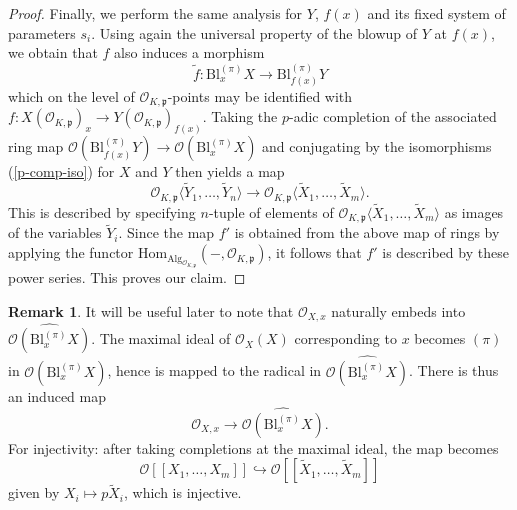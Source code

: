 \documentclass[11pt,oneside]{amsart}
\theoremstyle{plain}
\theoremstyle{definition}
\newtheorem{remark}[theorem]{Remark}
\def\oh{\mathcal{O}}
\begin{document}
\begin{proof}
Finally, we perform the same analysis for $Y$, $f(x)$ and its fixed system of parameters $s_i$. Using again the universal property of the blowup of $Y$ at $f(x)$, we obtain that $f$ also induces a morphism 
$$\tilde{f}: \mathrm{Bl}_x^{(\pi)} X \rightarrow \mathrm{Bl}_{f(x)}^{(\pi)} Y$$ %
which on the level of $\oh_{K,\mathfrak{p}}$-points may be identified with $f: X(\oh_{K, \mathfrak{p}})_x\rightarrow Y(\oh_{K, \mathfrak{p}})_{f(x)}$. Taking the $p$-adic completion of the associated ring map $\oh(\mathrm{Bl}_{f(x)}^{(\pi)} Y) \rightarrow \oh(\mathrm{Bl}_{x}^{(\pi)} X)$ and conjugating by the isomorphisms (\ref{p-comp-iso}) for $X$ and $Y$ then yields a map 
$$\oh_{K, \mathfrak{p}}\langle\tilde{Y}_1, \dots, \tilde{Y}_{n} \rangle \rightarrow \oh_{K, \mathfrak{p}}\langle\tilde{X}_1, \dots, \tilde{X}_m \rangle.$$
This is described by specifying $n$-tuple of elements of $\oh_{K, \mathfrak{p}}\langle\tilde{X}_1, \dots, \tilde{X}_m \rangle$ as images of the variables $\tilde{Y}_i$.  Since the map $f'$ is obtained from the above map of rings by applying the functor $\mathrm{Hom}_{\mathrm{Alg}_{\oh_{K, \mathfrak{p}}}}(-, \oh_{K, \mathfrak{p}})$, it follows that $f'$ is described by these power series. This proves our claim. 
\end{proof}


\begin{remark}\label{rem:ParametrizeCoefficients}
It will be useful later to note that $\oh_{X, x}$ naturally embeds into $\widehat{\oh(\mathrm{Bl}_{x}^{(\pi)} X)}$. The maximal ideal of $\oh_X(X)$ corresponding to $x$ becomes $(\pi)$ in $\oh(\mathrm{Bl}_{x}^{(\pi)} X)$, hence is mapped to the radical in $\widehat{\oh(\mathrm{Bl}_{x}^{(\pi)} X)}$. 
There is thus an induced map 
$$\oh_{X, x} \longrightarrow \widehat{\oh(\mathrm{Bl}_{x}^{(\pi)} X)}.$$ For injectivity: after taking completions at the maximal ideal, the map becomes 
$$\oh[[X_1, \dots, X_m]]\hookrightarrow \oh[[\tilde{X}_1, \dots, \tilde{X}_m]]$$ given by $X_i \mapsto p \tilde{X}_i$, which is injective.
\end{remark}


\end{document}
